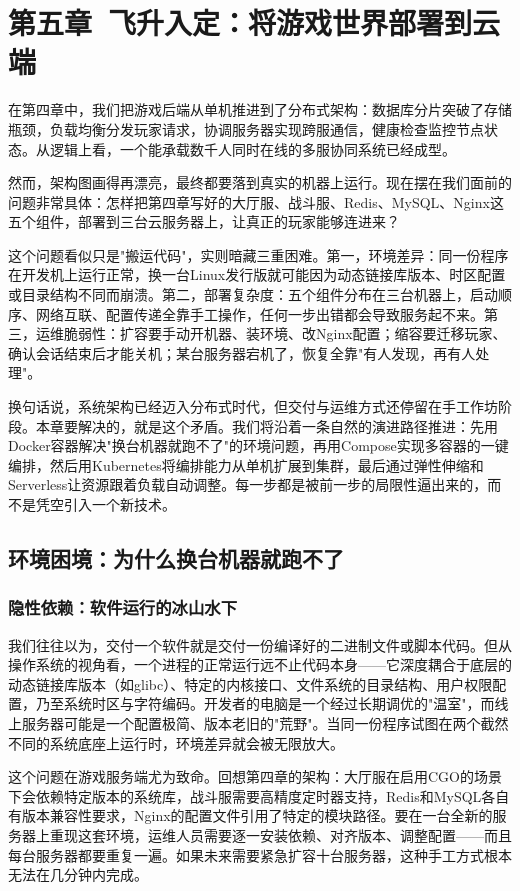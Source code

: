 \section{第五章\ 飞升入定：将游戏世界部署到云端}


在第四章中，我们把游戏后端从单机推进到了分布式架构：数据库分片突破了存储瓶颈，负载均衡分发玩家请求，协调服务器实现跨服通信，健康检查监控节点状态。从逻辑上看，一个能承载数千人同时在线的多服协同系统已经成型。

然而，架构图画得再漂亮，最终都要落到真实的机器上运行。现在摆在我们面前的问题非常具体：怎样把第四章写好的大厅服、战斗服、Redis、MySQL、Nginx这五个组件，部署到三台云服务器上，让真正的玩家能够连进来？

这个问题看似只是"搬运代码"，实则暗藏三重困难。第一，环境差异：同一份程序在开发机上运行正常，换一台Linux发行版就可能因为动态链接库版本、时区配置或目录结构不同而崩溃。第二，部署复杂度：五个组件分布在三台机器上，启动顺序、网络互联、配置传递全靠手工操作，任何一步出错都会导致服务起不来。第三，运维脆弱性：扩容要手动开机器、装环境、改Nginx配置；缩容要迁移玩家、确认会话结束后才能关机；某台服务器宕机了，恢复全靠"有人发现，再有人处理"。

换句话说，系统架构已经迈入分布式时代，但交付与运维方式还停留在手工作坊阶段。本章要解决的，就是这个矛盾。我们将沿着一条自然的演进路径推进：先用Docker容器解决"换台机器就跑不了"的环境问题，再用Compose实现多容器的一键编排，然后用Kubernetes将编排能力从单机扩展到集群，最后通过弹性伸缩和Serverless让资源跟着负载自动调整。每一步都是被前一步的局限性逼出来的，而不是凭空引入一个新技术。

\subsection{环境困境：为什么换台机器就跑不了}

\subsubsection{隐性依赖：软件运行的冰山水下}

我们往往以为，交付一个软件就是交付一份编译好的二进制文件或脚本代码。但从操作系统的视角看，一个进程的正常运行远不止代码本身——它深度耦合于底层的动态链接库版本（如glibc）、特定的内核接口、文件系统的目录结构、用户权限配置，乃至系统时区与字符编码。开发者的电脑是一个经过长期调优的"温室"，而线上服务器可能是一个配置极简、版本老旧的"荒野"。当同一份程序试图在两个截然不同的系统底座上运行时，环境差异就会被无限放大。

这个问题在游戏服务端尤为致命。回想第四章的架构：大厅服在启用CGO的场景下会依赖特定版本的系统库，战斗服需要高精度定时器支持，Redis和MySQL各自有版本兼容性要求，Nginx的配置文件引用了特定的模块路径。要在一台全新的服务器上重现这套环境，运维人员需要逐一安装依赖、对齐版本、调整配置——而且每台服务器都要重复一遍。如果未来需要紧急扩容十台服务器，这种手工方式根本无法在几分钟内完成。

